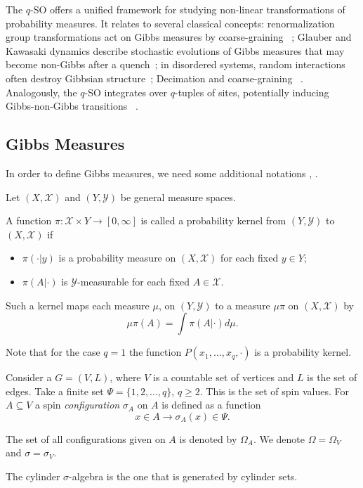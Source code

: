\documentclass[11pt,reqno]{amsart}
\numberwithin{equation}{section} \setcounter{tocdepth}{1}
\begin{document}
The $q$-SO offers a unified framework for studying non-linear transformations of probability measures. It relates to several classical concepts: renormalization group transformations act on Gibbs measures by coarse-graining ~\cite{Enter};  Glauber and Kawasaki dynamics describe stochastic evolutions of Gibbs measures that may become non-Gibbs after a quench~\cite{Liggett1985, KipnisLandim1999}; in disordered systems, random interactions often destroy Gibbsian structure~\cite{Bovier2006}; Decimation and coarse-graining ~\cite{GriffithsPearce1978, BleherSinai1976}. Analogously, the $q$-SO integrates over $q$-tuples of sites, 
potentially inducing Gibbs-non-Gibbs transitions ~\cite{Fe}.


\subsection{Gibbs Measures}
In order to define Gibbs measures, we need some additional notations  \cite{K}, \cite{She}.

Let $(X, \mathcal X)$ and $(Y, \mathcal Y)$ be general measure spaces.

A function $\pi : \mathcal X\times Y\to [0, \infty]$ is called a probability kernel from $(Y, \mathcal Y)$ to $(X, \mathcal X)$ if
\begin{itemize}
	\item[1.] $\pi(\cdot | y)$ is a probability measure on $(X, \mathcal X)$ for each fixed $y\in Y$;
	\item[2.] $\pi(A | \cdot)$ is $\mathcal Y$-measurable for each fixed $A\in \mathcal X$.
\end{itemize}

Such a kernel maps each measure $\mu$, on $(Y, \mathcal Y)$ to a measure $\mu\pi$ on $(X, \mathcal X)$ by
$$\mu\pi(A)=\int \pi(A | \cdot)d\mu.$$

Note that for the case $q=1$ the function $P(x_1, \dots, x_q,\cdot)$ is a probability kernel. 

Consider a $G=(V,L)$, where $V$ is a countable set of vertices and $L$ is the set of edges. Take a finite set $\Psi=\{1,2,...,q\}$, $q\geq 2$. This is the set of spin values.
For $A\subseteq V$ a spin {\it configuration} $\sigma_A$
on $A$ is defined as a function $$x\in
A\to\sigma_A(x)\in\Psi.$$

The set of all configurations given on $A$ is denoted by $\Omega_A$.
We denote $\Omega=\Omega_V$ and
$\sigma=\sigma_V.$

The cylinder $\sigma$-algebra  is the one that is
generated by cylinder sets.
\end{document}
